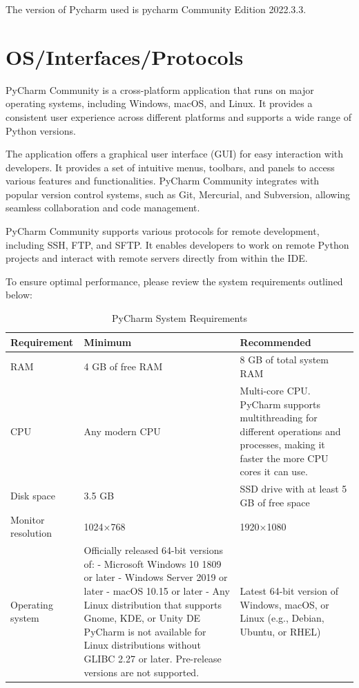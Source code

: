 The version of Pycharm used is pycharm Community Edition 2022.3.3.


\section{OS/Interfaces/Protocols}
PyCharm Community is a cross-platform application that runs on major operating systems, including Windows, macOS, and Linux. It provides a consistent user experience across different platforms and supports a wide range of Python versions.

The application offers a graphical user interface (GUI) for easy interaction with developers. It provides a set of intuitive menus, toolbars, and panels to access various features and functionalities. PyCharm Community integrates with popular version control systems, such as Git, Mercurial, and Subversion, allowing seamless collaboration and code management.

PyCharm Community supports various protocols for remote development, including SSH, FTP, and SFTP. It enables developers to work on remote Python projects and interact with remote servers directly from within the IDE.

To ensure optimal performance, please review the system requirements outlined below:

\begin{table}[h!]
	\centering
	\caption{PyCharm System Requirements}
	\label{tab:system-requirements}
	\begin{tabular}{|p{3cm}|p{4cm}|p{4cm}|}
		\hline
		\textbf{Requirement} & \textbf{Minimum} & \textbf{Recommended} \\ \hline
		RAM & 4 GB of free RAM & 8 GB of total system RAM \\ \hline
		CPU & Any modern CPU & Multi-core CPU. PyCharm supports multithreading for different operations and processes, making it faster the more CPU cores it can use. \\ \hline
		Disk space & 3.5 GB & SSD drive with at least 5 GB of free space \\ \hline
		Monitor resolution & 1024×768 & 1920×1080 \\ \hline
		Operating system & Officially released 64-bit versions of: 
		- Microsoft Windows 10 1809 or later
		- Windows Server 2019 or later
		- macOS 10.15 or later
		- Any Linux distribution that supports Gnome, KDE, or Unity DE
		PyCharm is not available for Linux distributions without GLIBC 2.27 or later.
		Pre-release versions are not supported. & Latest 64-bit version of Windows, macOS, or Linux (e.g., Debian, Ubuntu, or RHEL) \\ \hline
	\end{tabular}
\end{table}


